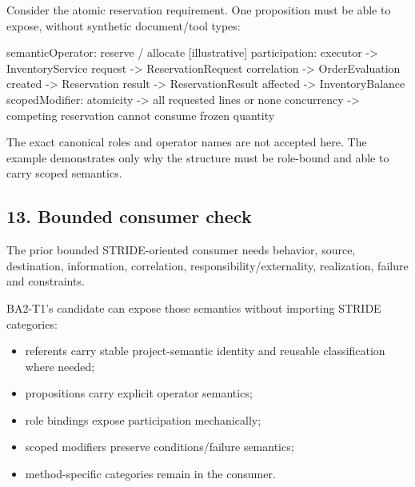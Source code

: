 \documentclass[
  10pt,
  letterpaper,
]{article}
\newenvironment{Shaded}{}{}
\newcommand{\NormalTok}[1]{#1}
\providecommand{\tightlist}{%
  \setlength{\itemsep}{0pt}\setlength{\parskip}{0pt}}
\begin{document}
Consider the atomic reservation requirement. One proposition must be
able to expose, without synthetic document/tool types:

\begin{Shaded}
\begin{Highlighting}[]
\NormalTok{semanticOperator: reserve / allocate   [illustrative]}
\NormalTok{participation:}
\NormalTok{  executor     {-}\textgreater{} InventoryService}
\NormalTok{  request      {-}\textgreater{} ReservationRequest}
\NormalTok{  correlation  {-}\textgreater{} OrderEvaluation}
\NormalTok{  created      {-}\textgreater{} Reservation}
\NormalTok{  result       {-}\textgreater{} ReservationResult}
\NormalTok{  affected     {-}\textgreater{} InventoryBalance}
\NormalTok{scopedModifier:}
\NormalTok{  atomicity    {-}\textgreater{} all requested lines or none}
\NormalTok{  concurrency  {-}\textgreater{} competing reservation cannot consume frozen quantity}
\end{Highlighting}
\end{Shaded}

The exact canonical roles and operator names are not accepted here. The
example demonstrates only why the structure must be role-bound and able
to carry scoped semantics.

\subsection{13. Bounded consumer check}\label{bounded-consumer-check}

The prior bounded STRIDE-oriented consumer needs behavior, source,
destination, information, correlation, responsibility/externality,
realization, failure and constraints.

BA2-T1's candidate can expose those semantics without importing STRIDE
categories:

\begin{itemize}
\tightlist
\item
  referents carry stable project-semantic identity and reusable
  classification where needed;
\item
  propositions carry explicit operator semantics;
\item
  role bindings expose participation mechanically;
\item
  scoped modifiers preserve conditions/failure semantics;
\item
  method-specific categories remain in the consumer.
\end{itemize}
\end{document}
